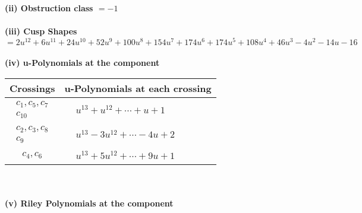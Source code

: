 \documentclass[1p]{elsarticle_modified}
\theoremstyle{definition}
\begin{document}
\flushleft \textbf{(ii) Obstruction class $= -1$}\\~\\
\flushleft \textbf{(iii) Cusp Shapes $= 2 u^{12}+6 u^{11}+24 u^{10}+52 u^9+100 u^8+154 u^7+174 u^6+174 u^5+108 u^4+46 u^3-4 u^2-14 u-16$}\\~\\
\newpage\renewcommand{\arraystretch}{1}
\flushleft \textbf{(iv) u-Polynomials at the component}\newline \\
\begin{tabular}{m{50pt}|m{274pt}}
Crossings & \hspace{64pt}u-Polynomials at each crossing \\
\hline $$\begin{aligned}c_{1},c_{5},c_{7}\\c_{10}\end{aligned}$$&$\begin{aligned}
&u^{13}+u^{12}+\cdots+u+1
\end{aligned}$\\
\hline $$\begin{aligned}c_{2},c_{3},c_{8}\\c_{9}\end{aligned}$$&$\begin{aligned}
&u^{13}-3 u^{12}+\cdots-4 u+2
\end{aligned}$\\
\hline $$\begin{aligned}c_{4},c_{6}\end{aligned}$$&$\begin{aligned}
&u^{13}+5 u^{12}+\cdots+9 u+1
\end{aligned}$\\
\hline
\end{tabular}\\~\\
\newpage\renewcommand{\arraystretch}{1}
\flushleft \textbf{(v) Riley Polynomials at the component}\newline \\
\end{document}
